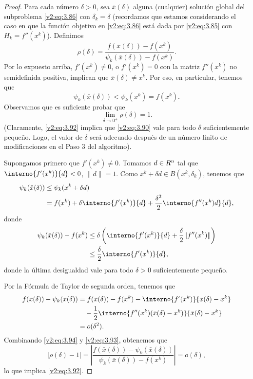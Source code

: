 \begin{proof}
    Para cada número $\delta > 0$, sea $\bar{x}(\delta)$ alguna (cualquier) solución global del subproblema \eqref{v2:eq:3.86} con $\delta_k = \delta$ (recordamos que estamos considerando el caso en que la función objetivo en \eqref{v2:eq:3.86} está dada por \eqref{v2:eq:3.85} con $H_k = f''(x^k)$). Definimos
    \begin{equation}
        \rho(\delta) = \frac{f(\bar{x}(\delta)) - f(x^k)}{\psi_k(\bar{x}(\delta)) - f(x^k)}.
        \label{v2:eq:3.91}
    \end{equation}
    Por lo expuesto arriba, $f'(x^k) \neq 0$, o $f'(x^k) = 0$ con la matriz $f''(x^k)$ no semidefinida positiva, implican que $\bar{x}(\delta) \neq x^k$. Por eso, en particular, tenemos que
    \[
        \psi_k(\bar{x}(\delta)) < \psi_k(x^k) = f(x^k).
    \]
    Observamos que es suficiente probar que
    \begin{equation}
        \lim_{\delta \to 0^+} \rho(\delta) = 1.
        \label{v2:eq:3.92}
    \end{equation}
    (Claramente, \eqref{v2:eq:3.92} implica que \eqref{v2:eq:3.90} vale para todo $\delta$ suficientemente pequeño. Logo, el valor de $\delta$ será adecuado después de un número finito de modificaciones en el Paso 3 del algoritmo).
    
    Supongamos primero que $f'(x^k) \neq 0$. Tomamos $d \in R^n$ tal que $\interno{f'(x^k)}{d} < 0$, $\|d\| = 1$. Como $x^k + \delta d \in B(x^k, \delta_k)$, tenemos que
    \begin{align*}
        \psi_k(\bar{x}(\delta)) &\le \psi_k(x^k + \delta d) \\
        &= f(x^k) + \delta \interno{f'(x^k)}{d} + \frac{\delta^2}{2}\interno{f''(x^k)d}{d},
    \end{align*}
    donde
    \begin{align}
        \psi_k(\bar{x}(\delta)) - f(x^k) &\le \delta\left( \interno{f'(x^k)}{d} + \frac{\delta}{2}\|f''(x^k)\| \right) \nonumber \\
        &\le \frac{\delta}{2}\interno{f'(x^k)}{d}, \label{v2:eq:3.93}
    \end{align}
    donde la última desigualdad vale para todo $\delta > 0$ suficientemente pequeño.
    
    Por la Fórmula de Taylor de segunda orden, tenemos que
    \begin{align}
        f(\bar{x}(\delta)) - \psi_k(\bar{x}(\delta)) &= f(\bar{x}(\delta)) - f(x^k) - \interno{f'(x^k)}{\bar{x}(\delta) - x^k} \nonumber \\
        &\quad - \frac{1}{2}\interno{f''(x^k)(\bar{x}(\delta) - x^k)}{\bar{x}(\delta) - x^k} \nonumber \\
        &= o(\delta^2). \label{v2:eq:3.94}
    \end{align}
    Combinando \eqref{v2:eq:3.94} y \eqref{v2:eq:3.93}, obtenemos que
    \[
        |\rho(\delta) - 1| = \left| \frac{f(\bar{x}(\delta)) - \psi_k(\bar{x}(\delta))}{\psi_k(\bar{x}(\delta)) - f(x^k)} \right| = o(\delta),
    \]
    lo que implica \eqref{v2:eq:3.92}.
    

\end{proof}
